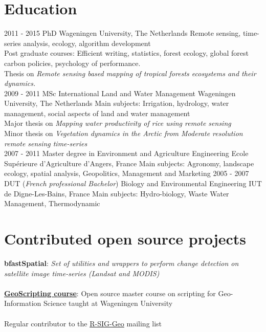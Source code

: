 \documentclass[]{friggeri-cv}
\begin{document}
\section{Education}
\begin{entrylist}
  \entry
    {2011 - 2015}
    {PhD}
    {Wageningen University, The Netherlands}
    {Remote sensing, time-series analysis, ecology, algorithm development\\
    Post graduate courses: Efficient writing, statistics, forest ecology, global forest carbon policies, psychology of performance.\\
    Thesis on \emph{Remote sensing based mapping of tropical forests ecosystems and their dynamics.}\\}
  \entry
    {2009 - 2011}
    {MSc International Land and Water Management}
    {Wageningen University, The Netherlands}
    {Main subjects: Irrigation, hydrology, water management, social aspects of land and water management \\
    Major thesis on \emph{Mapping water productivity of rice using remote sensing}\\
    Minor thesis on \emph{Vegetation dynamics in the Arctic from Moderate resolution remote sensing time-series}\\}
  \entry
    {2007 - 2011}
    {Master degree in Environment and Agriculture Engineering}
    {Ecole Supérieure d'Agriculture d'Angers, France}
    {Main subjects: Agronomy, landscape ecology, spatial analysis, Geopolitics, Management and Marketing}
  \entry
    {2005 - 2007}
    {DUT (\textit{French professional Bachelor}) Biology and Environmental Engineering}
    {IUT de Digne-Les-Bains, France}
    {Main subjects: Hydro-biology, Waste Water Management, Thermodynamic}
\end{entrylist}

\section{Contributed open source projects}
    \textbf{bfastSpatial}: \textit{Set of utilities and wrappers to perform change detection on satellite image time-series (Landsat and MODIS)}\\
    \\
    \href{http://geoscripting-wur.github.io/}{\textbf{GeoScripting course}}: Open source master course on scripting for Geo-Information Science taught at Wageningen University\\
    \\
    Regular contributor to the \href{https://stat.ethz.ch/mailman/listinfo/r-sig-geo}{R-SIG-Geo} mailing list
\end{document}

